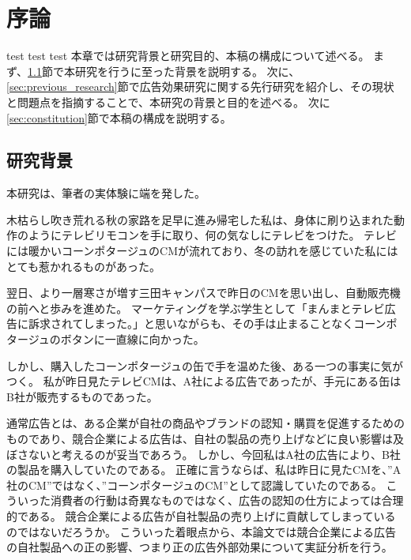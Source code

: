 \documentclass[11pt]{jsarticle}
\begin{document}
\newpage

 \setcounter{tocdepth}{3}

\tableofcontents

\newpage
{}
 \setcounter{tocdepth}{3}



\section{序論}
\label{ch:introduction}
test test test 
本章では研究背景と研究目的、本稿の構成について述べる。
まず、\ref{sec:background}節で本研究を行うに至った背景を説明する。
次に、\ref{sec:previous_research}節で広告効果研究に関する先行研究を紹介し、その現状と問題点を指摘することで、本研究の背景と目的を述べる。
次に\ref{sec:constitution}節で本稿の構成を説明する。

\subsection{研究背景}
 \label{sec:background}
 本研究は、筆者の実体験に端を発した。
 
木枯らし吹き荒れる秋の家路を足早に進み帰宅した私は、身体に刷り込まれた動作のようにテレビリモコンを手に取り、何の気なしにテレビをつけた。
テレビには暖かいコーンポタージュのCMが流れており、冬の訪れを感じていた私にはとても惹かれるものがあった。

翌日、より一層寒さが増す三田キャンパスで昨日のCMを思い出し、自動販売機の前へと歩みを進めた。
マーケティングを学ぶ学生として「まんまとテレビ広告に訴求されてしまった。」と思いながらも、その手は止まることなくコーンポタージュのボタンに一直線に向かった。

しかし、購入したコーンポタージュの缶で手を温めた後、ある一つの事実に気がつく。
私が昨日見たテレビCMは、A社による広告であったが、手元にある缶はB社が販売するものであった。

通常広告とは、ある企業が自社の商品やブランドの認知・購買を促進するためのものであり、競合企業による広告は、自社の製品の売り上げなどに良い影響は及ぼさないと考えるのが妥当であろう。
しかし、今回私はA社の広告により、B社の製品を購入していたのである。
正確に言うならば、私は昨日に見たCMを、”A社のCM”ではなく、”コーンポタージュのCM”として認識していたのである。
こういった消費者の行動は奇異なものではなく、広告の認知の仕方によっては合理的である。
競合企業による広告が自社製品の売り上げに貢献してしまっているのではないだろうか。
こういった着眼点から、本論文では競合企業による広告の自社製品への正の影響、つまり正の広告外部効果について実証分析を行う。
\end{document}
